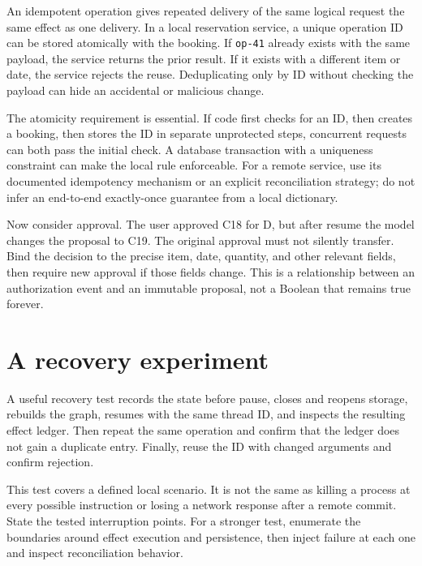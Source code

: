 An idempotent operation gives repeated delivery of the same logical request the same effect as one delivery. In a local reservation service, a unique operation ID can be stored atomically with the booking. If \texttt{op-41} already exists with the same payload, the service returns the prior result. If it exists with a different item or date, the service rejects the reuse. Deduplicating only by ID without checking the payload can hide an accidental or malicious change.

The atomicity requirement is essential. If code first checks for an ID, then creates a booking, then stores the ID in separate unprotected steps, concurrent requests can both pass the initial check. A database transaction with a uniqueness constraint can make the local rule enforceable. For a remote service, use its documented idempotency mechanism or an explicit reconciliation strategy; do not infer an end-to-end exactly-once guarantee from a local dictionary.

Now consider approval. The user approved C18 for D, but after resume the model changes the proposal to C19. The original approval must not silently transfer. Bind the decision to the precise item, date, quantity, and other relevant fields, then require new approval if those fields change. This is a relationship between an authorization event and an immutable proposal, not a Boolean that remains true forever.

\section{A recovery experiment}
A useful recovery test records the state before pause, closes and reopens storage, rebuilds the graph, resumes with the same thread ID, and inspects the resulting effect ledger. Then repeat the same operation and confirm that the ledger does not gain a duplicate entry. Finally, reuse the ID with changed arguments and confirm rejection.

This test covers a defined local scenario. It is not the same as killing a process at every possible instruction or losing a network response after a remote commit. State the tested interruption points. For a stronger test, enumerate the boundaries around effect execution and persistence, then inject failure at each one and inspect reconciliation behavior.


